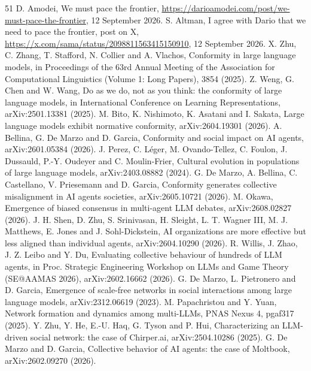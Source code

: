 \documentclass[11pt]{article}
\begin{document}
\begin{thebibliography}{51}
 D. Amodei, We must pace the frontier, \url{https://darioamodei.com/post/we-must-pace-the-frontier}, 12 September 2026.
 S. Altman, I agree with Dario that we need to pace the frontier, post on X, \url{https://x.com/sama/status/2098811563415150910}, 12 September 2026.
 X. Zhu, C. Zhang, T. Stafford, N. Collier and A. Vlachos, Conformity in large language models, in Proceedings of the 63rd Annual Meeting of the Association for Computational Linguistics (Volume 1: Long Papers), 3854 (2025).
 Z. Weng, G. Chen and W. Wang, Do as we do, not as you think: the conformity of large language models, in International Conference on Learning Representations, arXiv:2501.13381 (2025).
 M. Bito, K. Nishimoto, K. Asatani and I. Sakata, Large language models exhibit normative conformity, arXiv:2604.19301 (2026).
 A. Bellina, G. De Marzo and D. Garcia, Conformity and social impact on AI agents, arXiv:2601.05384 (2026).
 J. Perez, C. L\'eger, M. Ovando-Tellez, C. Foulon, J. Dussauld, P.-Y. Oudeyer and C. Moulin-Frier, Cultural evolution in populations of large language models, arXiv:2403.08882 (2024).
 G. De Marzo, A. Bellina, C. Castellano, V. Priesemann and D. Garcia, Conformity generates collective misalignment in AI agents societies, arXiv:2605.10721 (2026).
 M. Okawa, Emergence of biased consensus in multi-agent LLM debates, arXiv:2608.02827 (2026).
 J. H. Shen, D. Zhu, S. Srinivasan, H. Sleight, L. T. Wagner III, M. J. Matthews, E. Jones and J. Sohl-Dickstein, AI organizations are more effective but less aligned than individual agents, arXiv:2604.10290 (2026).
 R. Willis, J. Zhao, J. Z. Leibo and Y. Du, Evaluating collective behaviour of hundreds of LLM agents, in Proc. Strategic Engineering Workshop on LLMs and Game Theory (SE@AAMAS 2026), arXiv:2602.16662 (2026).
 G. De Marzo, L. Pietronero and D. Garcia, Emergence of scale-free networks in social interactions among large language models, arXiv:2312.06619 (2023).
 M. Papachristou and Y. Yuan, Network formation and dynamics among multi-LLMs, PNAS Nexus 4, pgaf317 (2025).
 Y. Zhu, Y. He, E.-U. Haq, G. Tyson and P. Hui, Characterizing an LLM-driven social network: the case of Chirper.ai, arXiv:2504.10286 (2025).
 G. De Marzo and D. Garcia, Collective behavior of AI agents: the case of Moltbook, arXiv:2602.09270 (2026).

\end{thebibliography}
\end{document}
